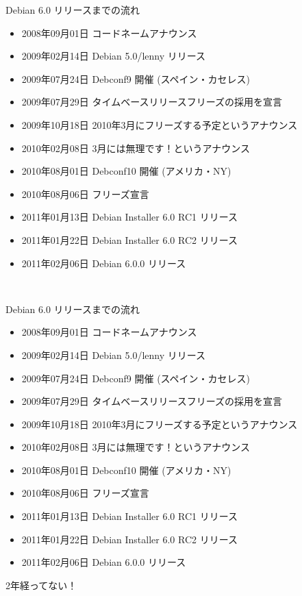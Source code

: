 \begin{frame}{Debian 6.0 リリースまでの流れ}
\begin{itemize}[<+->] 
\item 2008年09月01日 コードネームアナウンス
\item 2009年02月14日 Debian 5.0/lenny リリース
\item 2009年07月24日 Debconf9 開催 (スペイン・カセレス)
\item 2009年07月29日 タイムベースリリースフリーズの採用を宣言
\item 2009年10月18日 2010年3月にフリーズする予定というアナウンス
\item 2010年02月08日 3月には無理です！というアナウンス
\item 2010年08月01日 Debconf10 開催 (アメリカ・NY)
\item 2010年08月06日 フリーズ宣言
\item 2011年01月13日 Debian Installer 6.0 RC1 リリース
\item 2011年01月22日 Debian Installer 6.0 RC2 リリース
\item 2011年02月06日 Debian 6.0.0 リリース
\end{itemize}

\begin{center}
\Huge　%
\end{center}

\end{frame}


\begin{frame}{Debian 6.0 リリースまでの流れ}
\begin{itemize}
\item 2008年09月01日 コードネームアナウンス
\item {\color{red}2009年02月14日 Debian 5.0/lenny リリース}
\item 2009年07月24日 Debconf9 開催 (スペイン・カセレス)
\item 2009年07月29日 タイムベースリリースフリーズの採用を宣言
\item 2009年10月18日 2010年3月にフリーズする予定というアナウンス
\item 2010年02月08日 3月には無理です！というアナウンス
\item 2010年08月01日 Debconf10 開催 (アメリカ・NY)
\item 2010年08月06日 フリーズ宣言
\item 2011年01月13日 Debian Installer 6.0 RC1 リリース
\item 2011年01月22日 Debian Installer 6.0 RC2 リリース
\item {\color{red}2011年02月06日 Debian 6.0.0 リリース}
\end{itemize}

\begin{center}
\Huge  \color{red}2年経ってない！
\end{center}

\end{frame}


